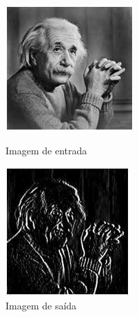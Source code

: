 \documentclass[a4paper, 12pt]{article}
\begin{document}
\begin{figure}[!htbp]
	\centering
	  \includegraphics[width=\linewidth]{images/einstein256.jpg}
	  \caption{Imagem de entrada}
	\endminipage\hspace{1cm}
	  \includegraphics[scale=0.62]{images/bordas.jpg}
	  \caption{Imagem de saída}
	\endminipage
\end{figure}
\end{document}
